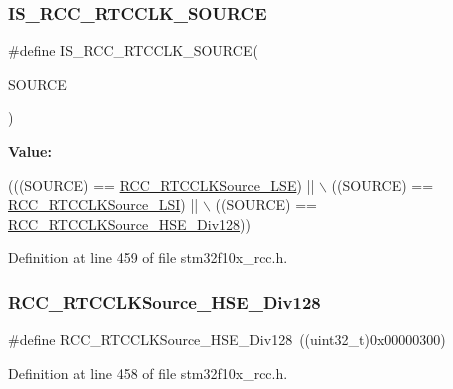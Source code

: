 \subsubsection{\texorpdfstring{I\+S\+\_\+\+R\+C\+C\+\_\+\+R\+T\+C\+C\+L\+K\+\_\+\+S\+O\+U\+R\+CE}{IS\_RCC\_RTCCLK\_SOURCE}}
{\footnotesize\ttfamily \#define I\+S\+\_\+\+R\+C\+C\+\_\+\+R\+T\+C\+C\+L\+K\+\_\+\+S\+O\+U\+R\+CE(\begin{DoxyParamCaption}\item[{}]{S\+O\+U\+R\+CE }\end{DoxyParamCaption})}

{\bfseries Value\+:}
\begin{DoxyCode}
(((SOURCE) == \hyperlink{group___r_t_c__clock__source_ga18c0c40ff4289148c9fa44c6848d5552}{RCC\_RTCCLKSource\_LSE}) || \(\backslash\)
                                      ((SOURCE) == \hyperlink{group___r_t_c__clock__source_ga7758c87e4584bfa76cb99c726b7162c3}{RCC\_RTCCLKSource\_LSI}) || \(\backslash\)
                                      ((SOURCE) == \hyperlink{group___r_t_c__clock__source_gada0bedcd0afa5104ec0ef398d1ac2778}{RCC\_RTCCLKSource\_HSE\_Div128}))
\end{DoxyCode}


Definition at line 459 of file stm32f10x\+\_\+rcc.\+h.

\mbox{\label{group___r_t_c__clock__source_gada0bedcd0afa5104ec0ef398d1ac2778}} 
\subsubsection{\texorpdfstring{R\+C\+C\+\_\+\+R\+T\+C\+C\+L\+K\+Source\+\_\+\+H\+S\+E\+\_\+\+Div128}{RCC\_RTCCLKSource\_HSE\_Div128}}
{\footnotesize\ttfamily \#define R\+C\+C\+\_\+\+R\+T\+C\+C\+L\+K\+Source\+\_\+\+H\+S\+E\+\_\+\+Div128~((uint32\+\_\+t)0x00000300)}



Definition at line 458 of file stm32f10x\+\_\+rcc.\+h.

\mbox{\label{group___r_t_c__clock__source_ga18c0c40ff4289148c9fa44c6848d5552}} 
